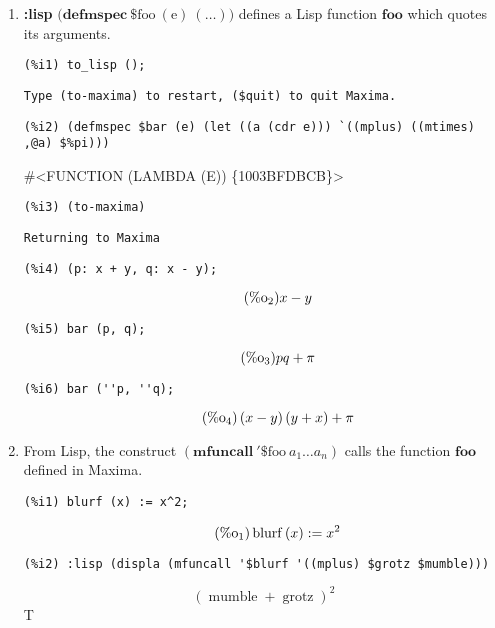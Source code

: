 \documentclass[12pt,leqno]{article}
\begin{document}
\begin{enumerate}
\item {\bf :lisp} $\mathrm{(}\mathbf{defmspec\ } \mathrm{\$foo\ (e)\ (\ldots))}$
defines a Lisp function $\mathbf{foo}$ which quotes its arguments.
\begin{verbatim}
(%i1) to_lisp ();
\end{verbatim}
\begin{Verbatim}
Type (to-maxima) to restart, ($quit) to quit Maxima.
\end{Verbatim}
\begin{verbatim}
(%i2) (defmspec $bar (e) (let ((a (cdr e))) `((mplus) ((mtimes) ,@a) $%pi)))
\end{verbatim}
\#\textless FUNCTION (LAMBDA (E)) \{1003BFDBCB\}\textgreater
\begin{verbatim}
(%i3) (to-maxima)
\end{verbatim}
\begin{Verbatim}
Returning to Maxima
\end{Verbatim}
\begin{verbatim}
(%i4) (p: x + y, q: x - y);
\end{verbatim}
\begin{equation}
\tag{$\mathop{\mathrm{\%o}_{2}}$}x-y
\label{eq:doc-group1-code38-4-1}
\end{equation}
\begin{verbatim}
(%i5) bar (p, q);
\end{verbatim}
\begin{equation}
\tag{$\mathop{\mathrm{\%o}_{3}}$}p q+\pi
\label{eq:doc-group1-code38-5-1}
\end{equation}
\begin{verbatim}
(%i6) bar (''p, ''q);
\end{verbatim}
\begin{equation}
\tag{$\mathop{\mathrm{\%o}_{4}}$}\left(x-y\right) \left(y+x\right)+\pi
\label{eq:doc-group1-code38-6-1}
\end{equation}


\item From Lisp, the construct $(\mathbf{mfuncall\ '\$}\mathrm{foo\ }a_1 \ldots a_n)$
calls the function $\mathbf{foo}$ defined in Maxima.

\begin{verbatim}
(%i1) blurf (x) := x^2;
\end{verbatim}
\begin{equation}
\tag{$\mathop{\mathrm{\%o}_{1}}$}\mathop{\mathrm{blurf}}\left(x\right) := {x}^{2}
\label{eq:doc-group1-code39-1-1}
\end{equation}
\begin{verbatim}
(%i2) :lisp (displa (mfuncall '$blurf '((mplus) $grotz $mumble)))
\end{verbatim}
\begin{equation}
{\left(\mathop{\mathrm{mumble}}+\mathop{\mathrm{grotz}}\right)}^{2}
\label{eq:doc-group1-code39-2-1}
\end{equation}
T

\end{enumerate}
\end{document}

